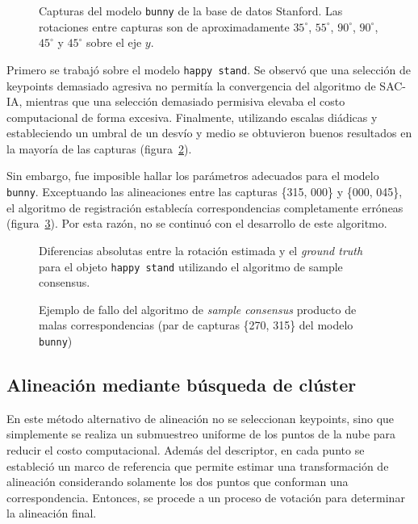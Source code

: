             \begin{figure}
                \caption[Capturas del modelo \texttt{bunny}]{\label{fig:bunny_stanford}Capturas del modelo \texttt{bunny} de la base de datos Stanford.
                Las rotaciones  entre capturas son de aproximadamente
                $35^{\circ}$, $55^{\circ}$, $90^{\circ}$, $90^{\circ}$, $45^{\circ}$ y $45^{\circ}$
                sobre el eje $y$.
                }
            \end{figure}

			Primero se trabajó sobre el modelo \texttt{happy stand}.
			Se observó que una selección de keypoints demasiado agresiva no permitía la convergencia del algoritmo de SAC-IA,
			mientras que una selección demasiado permisiva elevaba el costo computacional de forma excesiva.
			Finalmente, utilizando escalas diádicas y estableciendo un umbral de un desvío y medio
			se obtuvieron buenos resultados en la mayoría de las capturas (figura~\ref{fig:dif_rot_happy_sac}).

			Sin embargo, fue imposible hallar los parámetros adecuados para el modelo \texttt{bunny}.
			Exceptuando las alineaciones entre las capturas \{315, 000\} y \{000, 045\},
			el algoritmo de registración establecía correspondencias completamente erróneas (figura~\ref{fig:align_sac}).
			Por esta razón, no se continuó con el desarrollo de este algoritmo.

			\begin{figure}
				
				\caption[Diferencias en la rotación estimada para el objeto \texttt{happy stand} (SAC-IA)]
				{\label{fig:dif_rot_happy_sac}Diferencias absolutas entre la rotación estimada y el \emph{ground truth} para el objeto \texttt{happy stand}
				utilizando el algoritmo de sample consensus.}
			\end{figure}

			\begin{figure}
				\caption[Fallo en el algoritmo de \emph{sample consensus}]{\label{fig:align_sac}Ejemplo de fallo del algoritmo de \emph{sample consensus} producto de malas correspondencias
				(par de capturas \{270, 315\} del modelo \texttt{bunny})}
			\end{figure}


	\subsection{Alineación mediante búsqueda de clúster}
		En este método alternativo de alineación no se seleccionan keypoints,
		sino que simplemente se realiza un submuestreo uniforme de los puntos de la nube
		para reducir el costo computacional.
		Además del descriptor, en cada punto se estableció un marco de referencia
		que permite estimar una transformación de alineación
		considerando solamente los dos puntos que conforman una correspondencia\cite{ISS}.
		Entonces, se procede a un proceso de votación para determinar la alineación final.

